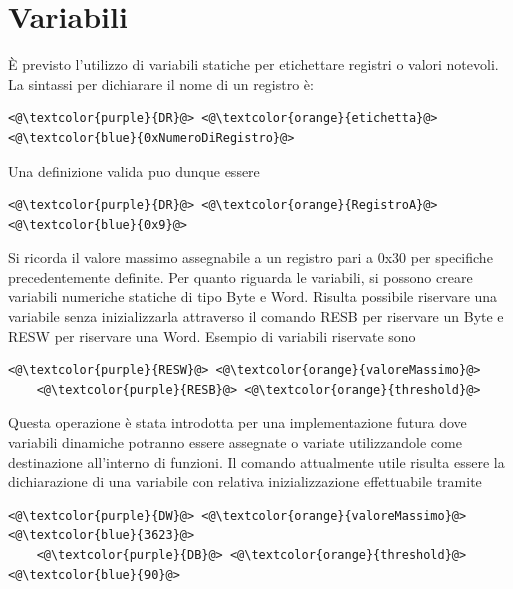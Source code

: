 \section{Variabili}
È previsto l'utilizzo di variabili statiche per etichettare registri o valori notevoli.
La sintassi per dichiarare il nome di un registro è:
\begin{lstlisting}[numbers=none]
    <@\textcolor{purple}{DR}@> <@\textcolor{orange}{etichetta}@> <@\textcolor{blue}{0xNumeroDiRegistro}@>
\end{lstlisting}
Una definizione valida puo dunque essere
\begin{lstlisting}[numbers=none]
    <@\textcolor{purple}{DR}@> <@\textcolor{orange}{RegistroA}@> <@\textcolor{blue}{0x9}@>
\end{lstlisting}
Si ricorda il valore massimo assegnabile a un registro pari a 0x30 per specifiche precedentemente definite.
Per quanto riguarda le variabili, si possono creare variabili numeriche statiche di tipo Byte e Word.
Risulta possibile riservare una variabile senza inizializzarla attraverso il comando RESB per riservare un Byte  e RESW per riservare una Word.
Esempio di variabili riservate sono
\begin{lstlisting}[numbers=none]
    <@\textcolor{purple}{RESW}@> <@\textcolor{orange}{valoreMassimo}@>
    <@\textcolor{purple}{RESB}@> <@\textcolor{orange}{threshold}@>
\end{lstlisting}
Questa operazione è stata introdotta per una implementazione futura dove variabili dinamiche potranno essere assegnate o variate utilizzandole come destinazione all'interno di funzioni.
Il comando attualmente utile risulta essere la dichiarazione di una variabile con relativa inizializzazione effettuabile tramite
\begin{lstlisting}[numbers=none]
    <@\textcolor{purple}{DW}@> <@\textcolor{orange}{valoreMassimo}@> <@\textcolor{blue}{3623}@>
    <@\textcolor{purple}{DB}@> <@\textcolor{orange}{threshold}@> <@\textcolor{blue}{90}@>
\end{lstlisting}


